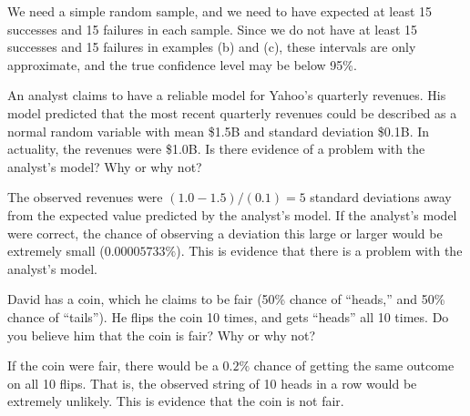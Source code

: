 \documentclass[11pt]{exam}
\begin{document}
\begin{questions}
\begin{solution}
We need a simple random sample, and we need to have expected at least 15
successes and 15 failures in each sample. Since we do not have at least 15
successes and 15 failures in examples (b) and (c), these intervals are only
approximate, and the true confidence level may be below 95\%.
\end{solution}


\newpage 



\question An analyst claims to have a reliable model for Yahoo's quarterly
revenues.  His model predicted that the most recent quarterly revenues could
be described as a normal random variable with mean \$1.5B and standard
deviation \$0.1B.  In actuality, the revenues were \$1.0B.  Is there evidence
of a problem with the analyst's model?  Why or why not?

\begin{solution}
The observed revenues were $(1.0 - 1.5) / (0.1) = 5$ standard deviations away
from the expected value predicted by the analyst's model.  If the analyst's
model were correct, the chance of observing a deviation this large or larger
would be extremely small ($0.00005733\%$).  This is evidence that there is a
problem with the analyst's model.
\end{solution}



\question David has a coin, which he claims to be fair (50\% chance of
``heads,'' and 50\% chance of ``tails'').  He flips the coin 10 times, and
gets ``heads'' all 10 times.  Do you believe him that the coin is fair?  Why
or why not?

\begin{solution}
If the coin were fair, there would be a $0.2\%$ chance of getting the same
outcome on all 10 flips.  That is, the observed string of 10 heads in a row
would be extremely unlikely.  This is evidence that the coin is not fair.
\end{solution}


\newpage 


\end{questions}
\end{document}
